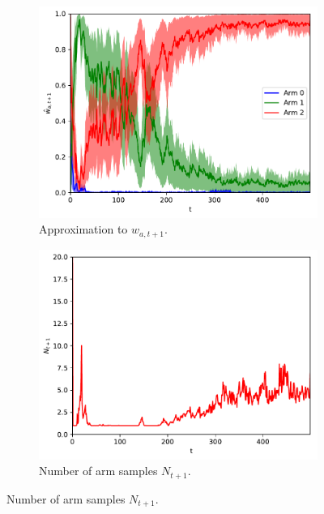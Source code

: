 \documentclass[10pt]{article}
\begin{document}
\begin{figure}[!h]
	\centering
	\begin{subfigure}[b]{0.33\textwidth}
		\includegraphics[width=\textwidth]{./figs/bernoulli/pred_action_density.pdf}
		\caption{Approximation to $w_{a,t+1}$.}
		\label{fig:pred_action_density}
	\end{subfigure}%
	\begin{subfigure}[b]{0.33\textwidth}
		\includegraphics[width=\textwidth]{./figs/bernoulli/n_samples.pdf}
		\caption{Number of arm samples $N_{t+1}$.}

\end{subfigure}
\end{figure}
\end{document}
